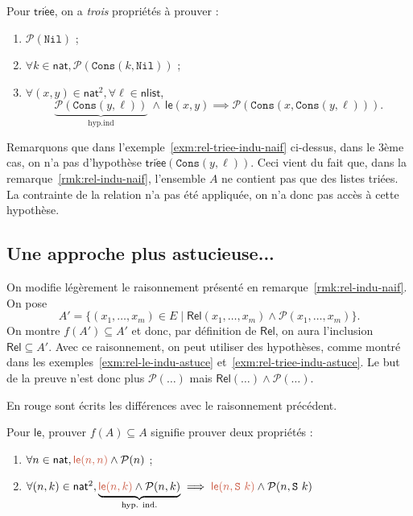 \documentclass[../main]{subfiles}
\begin{document}
  \begin{exm}\label{exm:rel-triee-indu-naif}
    Pour $\mathsf{tri\acute{e}e}$, on a \textit{trois} propriétés à prouver :
    \begin{enumerate}
      \item $\mathcal{P}(\mathtt{Nil})$ ;
      \item $\forall k \in \mathsf{nat}, \mathcal{P}(\mathtt{Cons}(k, \mathtt{Nil}))$ ;
      \item $\forall (x,y) \in \mathsf{nat}^2, \forall \ell \in \mathsf{nlist}$,
        \[
          \underbrace{\mathcal{P}(\mathtt{Cons}(y,\ell))}_\text{hyp.ind}\: \land\: \mathsf{le}(x,y) \implies \mathcal{P}(\mathtt{Cons}(x,\mathtt{Cons}(y,\ell)))
        .\] 
    \end{enumerate}
  \end{exm}

  \begin{rmk}
    Remarquons que dans l'exemple~\ref{exm:rel-triee-indu-naif} ci-dessus, dans le 3ème cas, on n'a pas d'hypothèse $\mathsf{tri\acute{e}e}(\mathtt{Cons}(y,\ell))$.
    Ceci vient du fait que, dans la remarque~\ref{rmk:rel-indu-naif}, l'ensemble $A$ ne contient pas que des listes triées.
    La contrainte de la relation n'a pas été appliquée, on n'a donc pas accès à cette hypothèse.
  \end{rmk}

  \subsection{Une approche plus astucieuse...}

  \begin{rmk}
    On modifie légèrement le raisonnement présenté en remarque~\ref{rmk:rel-indu-naif}.
    On pose \[
      A' = \{(x_1,\ldots,x_m) \in E  \mid  \mathsf{Rel}(x_1,\ldots,x_m) \land \mathcal{P}(x_1,\ldots,x_m)\} 
    .\]
    On montre $f(A') \subseteq A'$ et donc, par définition de $\mathsf{Rel}$, on aura l'inclusion $\mathsf{Rel} \subseteq A'$.
    Avec ce raisonnement, on peut utiliser des hypothèses, comme montré dans les exemples~\ref{exm:rel-le-indu-astuce} et~\ref{exm:rel-triee-indu-astuce}.
    Le but de la preuve n'est donc plus $\mathcal{P}(\ldots)$ mais $\mathsf{Rel}(\ldots) \land \mathcal{P}(\ldots)$.

    En rouge sont écrits les différences avec le raisonnement précédent.
  \end{rmk}

  \begin{exm}\label{exm:rel-le-indu-astuce}
    Pour $\mathsf{le}$, prouver $f(A) \subseteq A$ signifie prouver deux propriétés :
    \begin{enumerate}
      \item $\forall n \in \mathsf{nat}, {\color{nicered}\mathsf{le}(n,n)} \land \mathcal{P}(n)$ ;
      \item $\forall (n,k) \in \mathsf{nat}^2, \underbrace{{\color{nicered}\mathsf{le}(n,k)}\land\mathcal{P}(n,k)}_\text{hyp. ind.} \implies {\color{nicered}\mathsf{le}(n,\mathtt{S}\ k)}\land\mathcal{P}(n, \mathtt{S}\ k)$
    \end{enumerate}
  \end{exm}
\end{document}
